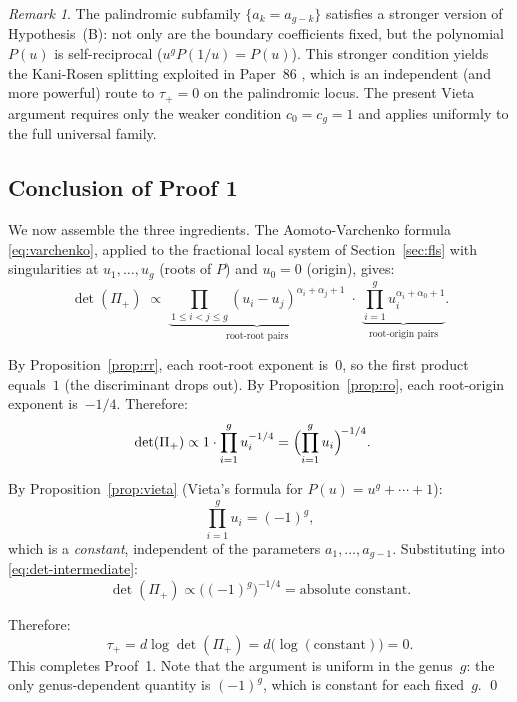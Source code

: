 \documentclass[11pt]{article}
\theoremstyle{plain}
\theoremstyle{definition}
\theoremstyle{remark}
\newtheorem{remark}[theorem]{Remark}
\begin{document}
\begin{remark}\label{rmk:vieta-palindromic}
  The palindromic subfamily $\{a_k = a_{g-k}\}$ satisfies a stronger
  version of Hypothesis~(B): not only are the boundary coefficients
  fixed, but the polynomial $P(u)$ is self-reciprocal ($u^g P(1/u) = P(u)$).
  This stronger condition yields the Kani-Rosen splitting exploited in
  Paper~86 \cite{p86}, which is an independent (and more powerful) route
  to $\tau_+ = 0$ on the palindromic locus.  The present Vieta argument
  requires only the weaker condition $c_0 = c_g = 1$ and applies uniformly
  to the full universal family.
\end{remark}

\subsection{Conclusion of Proof 1}

We now assemble the three ingredients.  The Aomoto-Varchenko formula
\eqref{eq:varchenko}, applied to the fractional local system of
Section~\ref{sec:fls} with singularities at $u_1, \ldots, u_g$ (roots of $P$)
and $u_0 = 0$ (origin), gives:
\[
  \det(\Pi_+) \;\propto\;
  \underbrace{\prod_{1 \leq i < j \leq g} (u_i - u_j)^{\alpha_i + \alpha_j + 1}}_{\text{root-root pairs}}
  \;\cdot\;
  \underbrace{\prod_{i=1}^{g} u_i^{\alpha_i + \alpha_0 + 1}}_{\text{root-origin pairs}}.
\]

By Proposition~\ref{prop:rr}, each root-root exponent is~$0$,
so the first product equals~$1$ (the discriminant drops out).
By Proposition~\ref{prop:ro}, each root-origin exponent is~$-1/4$.
Therefore:
\begin{align}
  \det(\Pi_+)
  &\propto 1 \cdot \prod_{i=1}^{g} u_i^{-1/4}
  = \Bigl(\prod_{i=1}^{g} u_i\Bigr)^{\!-1/4}. \label{eq:det-intermediate}
\end{align}

By Proposition~\ref{prop:vieta} (Vieta's formula for $P(u) = u^g + \cdots + 1$):
\[
  \prod_{i=1}^{g} u_i = (-1)^g,
\]
which is a \emph{constant}, independent of the parameters $a_1, \ldots, a_{g-1}$.
Substituting into \eqref{eq:det-intermediate}:
\begin{equation}\label{eq:det-constant}
  \det(\Pi_+) \propto \bigl((-1)^g\bigr)^{-1/4}
  = \text{absolute constant}.
\end{equation}

Therefore:
\[
  \tau_+ = d\log \det(\Pi_+) = d\bigl(\log(\text{constant})\bigr) = 0.
\]
This completes Proof~1.  Note that the argument is uniform in the genus~$g$:
the only genus-dependent quantity is $(-1)^g$, which is constant for each
fixed~$g$. \qed
\end{document}

